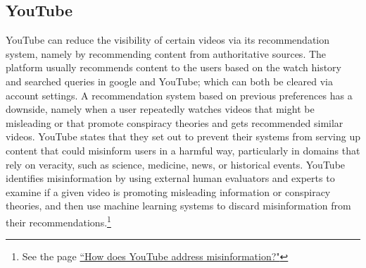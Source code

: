 \documentclass{article}
\begin{document}

\subsection{YouTube}

YouTube can reduce the visibility of certain videos via its recommendation system, namely by recommending content from authoritative sources.
The platform usually recommends content to the users based on the watch history and searched queries in google and YouTube; which can both be cleared via account settings.
A recommendation system based on previous preferences has a downside, namely when a user repeatedly watches videos that might be misleading or that promote conspiracy theories and gets recommended similar videos.
YouTube states that they set out to prevent their systems from serving up content that could misinform users in a harmful way, particularly in domains that rely on veracity, such as science, medicine, news, or historical events.
YouTube identifies misinformation by using external human evaluators and experts to examine if a given video is promoting misleading information or conspiracy theories, and then use machine learning systems to discard misinformation from their recommendations.\footnote{See the page \href{https://www.youtube.com/intl/ALL_ca/howyoutubeworks/our-commitments/fighting-misinformation/}{``How does YouTube address misinformation?"}}

\smallskip
\end{document}
